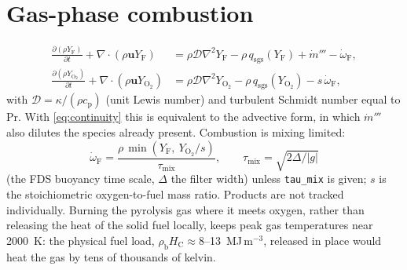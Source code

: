 \documentclass[11pt,a4paper]{article}
\newcommand{\vu}{\mathbf{u}}
\newcommand{\code}[1]{\texttt{#1}}
\newcommand{\Yf}{Y_\text{F}}
\newcommand{\YO}{Y_{\mathrm{O_2}}}
\begin{document}
\section{Gas-phase combustion}\label{sec:combustion}
\begin{align}\label{eq:species}
  \frac{\partial(\rho\Yf)}{\partial t} + \nabla\cdot(\rho\vu\Yf) &= \rho\mathcal{D}\nabla^2\Yf - \rho\,q_\text{sgs}(\Yf)
    + \dot m''' - \dot\omega_\text{F},\\
  \frac{\partial(\rho\YO)}{\partial t} + \nabla\cdot(\rho\vu\YO) &= \rho\mathcal{D}\nabla^2\YO - \rho\,q_\text{sgs}(\YO)
    - s\,\dot\omega_\text{F},
\end{align}
with $\mathcal{D}=\kappa/(\rho c_\text{p})$ (unit Lewis number) and turbulent Schmidt number equal to $\mathrm{Pr}$.
With \eqref{eq:continuity} this is equivalent to the advective form, in which $\dot m'''$ also dilutes
the species already present. Combustion is mixing limited:
\begin{equation}
  \dot\omega_\text{F} = \frac{\rho\,\min(\Yf,\ \YO/s)}{\tau_\text{mix}},\qquad \tau_\text{mix}=\sqrt{2\Delta/|g|}
\end{equation}
(the FDS buoyancy time scale, $\Delta$ the filter width) unless \code{tau\_mix} is given; $s$ is the
stoichiometric oxygen-to-fuel mass ratio. Products are not tracked individually. Burning the
pyrolysis gas where it meets oxygen, rather than releasing the heat of the solid fuel locally, keeps
peak gas temperatures near 2000~K: the physical fuel load, $\rho_\text{b}H_\text{C}\approx8$--13~MJ\,m$^{-3}$,
released in place would heat the gas by tens of thousands of kelvin.

\end{document}
